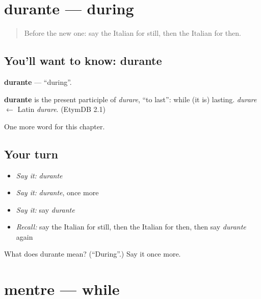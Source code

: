 \section[durante]{durante — during}

\label{lesson:IT-C187-durante}



\begin{quote}
Before the new one: say the Italian for still, then the Italian for then.
\end{quote}

\subsection*{You'll want to know: durante}
\textbf{durante} — \textquotedblleft{}during\textquotedblright{}.

\begin{cousinweb}
\textbf{durante} is the present participle of \emph{durare}, \textquotedblleft{}to last\textquotedblright{}: while (it is) lasting. \emph{durare} $\leftarrow$ Latin \emph{durare}. (EtymDB 2.1)
\end{cousinweb}

\begin{grammarlens}[title={What you've built}]
One more word for this chapter.
\end{grammarlens}

\subsection*{Your turn}
\begin{itemize}
\raggedright
  \item \emph{Say it:} \emph{durante}
  \item \emph{Say it:} \emph{durante}, once more
  \item \emph{Say it:} say \emph{durante}
  \item \emph{Recall:} say the Italian for still, then the Italian for then, then say \emph{durante} again
\end{itemize}

\begin{tcolorbox}[breakable,colback=teal!4,colframe=teal!35!black,title={Before you move on}]
What does durante mean? (\textquotedblleft{}During\textquotedblright{}.) Say it once more.
\end{tcolorbox}
\section[mentre]{mentre — while}

